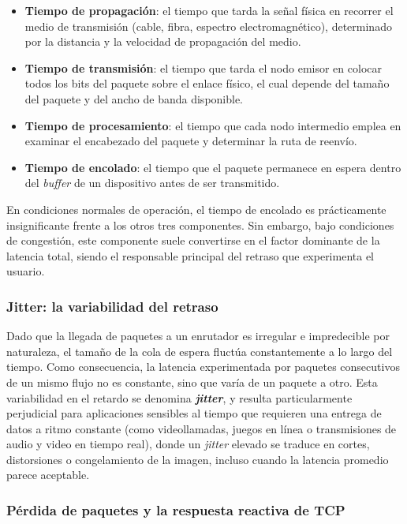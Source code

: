 \documentclass[12pt]{report}
\begin{document}
\begin{itemize}
    \item \textbf{Tiempo de propagación}: el tiempo que tarda la señal física en recorrer el medio de transmisión (cable, fibra, espectro electromagnético), determinado por la distancia y la velocidad de propagación del medio.
    \item \textbf{Tiempo de transmisión}: el tiempo que tarda el nodo emisor en colocar todos los bits del paquete sobre el enlace físico, el cual depende del tamaño del paquete y del ancho de banda disponible.
    \item \textbf{Tiempo de procesamiento}: el tiempo que cada nodo intermedio emplea en examinar el encabezado del paquete y determinar la ruta de reenvío.
    \item \textbf{Tiempo de encolado}: el tiempo que el paquete permanece en espera dentro del \textit{buffer} de un dispositivo antes de ser transmitido.
\end{itemize}

En condiciones normales de operación, el tiempo de encolado es prácticamente insignificante frente a los otros tres componentes. Sin embargo, bajo condiciones de congestión, este componente suele convertirse en el factor dominante de la latencia total, siendo el responsable principal del retraso que experimenta el usuario.

\subsubsection*{Jitter: la variabilidad del retraso}

Dado que la llegada de paquetes a un enrutador es irregular e impredecible por naturaleza, el tamaño de la cola de espera fluctúa constantemente a lo largo del tiempo. Como consecuencia, la latencia experimentada por paquetes consecutivos de un mismo flujo no es constante, sino que varía de un paquete a otro. Esta variabilidad en el retardo se denomina \textbf{\textit{jitter}}, 
y resulta particularmente perjudicial para aplicaciones sensibles al tiempo que requieren una entrega de datos a ritmo constante (como videollamadas, juegos en línea o transmisiones de audio y video en tiempo real), donde un \textit{jitter} elevado se traduce en cortes, distorsiones o congelamiento de la imagen, incluso cuando la latencia promedio parece aceptable.

\subsubsection*{Pérdida de paquetes y la respuesta reactiva de TCP}
\end{document}
